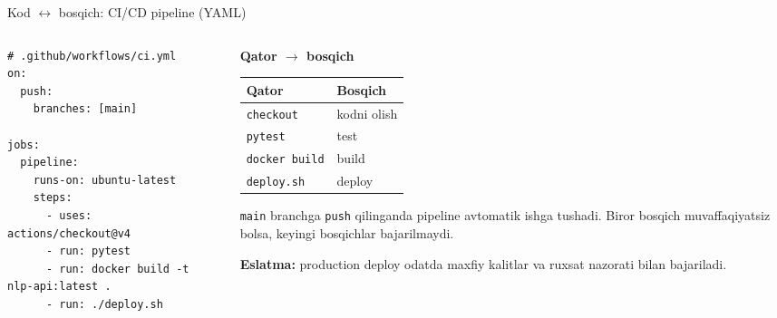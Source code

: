 \documentclass[aspectratio=169,11pt]{beamer}
\newcommand{\uzq}{\textquotesingle{}}   %
\begin{document}
\begin{frame}[fragile]{Kod $\leftrightarrow$ bosqich: CI/CD pipeline (YAML)}
  \small

  \begin{columns}[T,totalwidth=\textwidth]
    \begin{column}{0.60\textwidth}
\begin{lstlisting}[basicstyle=\ttfamily\scriptsize]
# .github/workflows/ci.yml
on:
  push:
    branches: [main]

jobs:
  pipeline:
    runs-on: ubuntu-latest
    steps:
      - uses: actions/checkout@v4
      - run: pytest
      - run: docker build -t nlp-api:latest .
      - run: ./deploy.sh
\end{lstlisting}
    \end{column}

    \begin{column}{0.37\textwidth}
      \textbf{Qator $\to$ bosqich}\\[3pt]

      \footnotesize
      \renewcommand{\arraystretch}{1.12}
      \begin{tabular}{p{2.05cm}p{1.65cm}}
        \toprule
        \textbf{Qator} & \textbf{Bosqich} \\
        \midrule
        \texttt{checkout} & kodni olish \\
        \texttt{pytest} & test \\
        \texttt{docker build} & build \\
        \texttt{deploy.sh} & deploy \\
        \bottomrule
      \end{tabular}

      \vspace{5pt}

      \begin{tcolorbox}[okbox,top=2pt,bottom=2pt,left=3pt,right=3pt]
        \footnotesize
        \texttt{main} branchga \texttt{push} qilinganda pipeline avtomatik ishga tushadi.
        Biror bosqich muvaffaqiyatsiz bo\uzq{}lsa, keyingi bosqichlar bajarilmaydi.
      \end{tcolorbox}

      \vspace{3pt}
      {\scriptsize
      \textbf{Eslatma:} production deploy odatda maxfiy kalitlar va ruxsat
      nazorati bilan bajariladi.
      }
    \end{column}
  \end{columns}
\end{frame}
\end{document}
